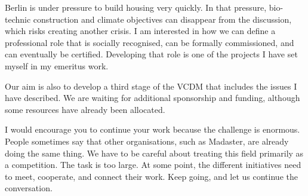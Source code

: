 Berlin is under pressure to build housing very quickly. In that pressure, bio-technic construction and climate objectives can disappear from the discussion, which risks creating another crisis. I am interested in how we can define a professional role that is socially recognised, can be formally commissioned, and can eventually be certified. Developing that role is one of the projects I have set myself in my emeritus work.

Our aim is also to develop a third stage of the VCDM that includes the issues I have described. We are waiting for additional sponsorship and funding, although some resources have already been allocated.

I would encourage you to continue your work because the challenge is enormous. People sometimes say that other organisations, such as Madaster, are already doing the same thing. We have to be careful about treating this field primarily as a competition. The task is too large. At some point, the different initiatives need to meet, cooperate, and connect their work. Keep going, and let us continue the conversation.

